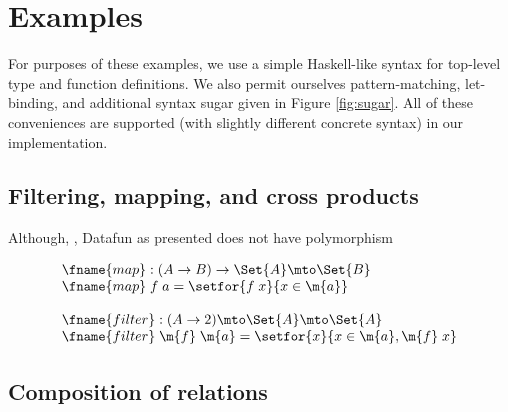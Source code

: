 \documentclass[preprint]{sigplanconf}
\newcommand{\uto}{\to}
\begin{document}

\pagebreak
\section{Examples}

For purposes of these examples, we use a simple Haskell-like syntax for
top-level type and function definitions. We also permit ourselves
pattern-matching, let-binding, and additional syntax sugar given in
Figure \ref{fig:sugar}. All of these conveniences are supported (with slightly
different concrete syntax) in our implementation.





\subsection{Filtering, mapping, and cross products}

Although, , Datafun as presented does not
have polymorphism

\[\begin{array}{l}
\fname{map} : (A \uto B) \to \Set{A} \mto \Set{B}\\
\fname{map}\;f\;a = \setfor{f\;x}{x \in \m{a}}\\
\\
\fname{filter} : (A \uto 2) \mto \Set{A} \mto \Set{A}\\
\fname{filter}\;\m{f}\;\m{a} = \setfor{x}{x \in \m{a}, \m{f}\; x}
\end{array}\]



\TODO

\subsection{Composition of relations}
\end{document}
